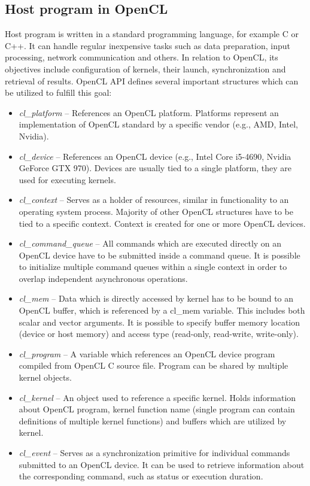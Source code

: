 \documentclass
[
    digital, %
    oneside, %
    table, %
    nolof, %
    nolot, %
    nocover %
]{fithesis3}
\begin{document}
\subsection{Host program in OpenCL}
Host program is written in a standard programming language, for example C or C++. It can handle regular inexpensive tasks such as data preparation,
input processing, network communication and others. In relation to OpenCL, its objectives include configuration of kernels, their launch,
synchronization and retrieval of results. OpenCL API defines several important structures which can be utilized to fulfill this goal:
\begin{itemize}
    \item \textit{cl\_platform} -- References an OpenCL platform. Platforms represent an implementation of OpenCL standard by a specific vendor
    (e.g., AMD, Intel, Nvidia). 
    \item \textit{cl\_device} -- References an OpenCL device (e.g., Intel Core i5-4690, Nvidia GeForce GTX 970). Devices are usually tied to a single
    platform, they are used for executing kernels.
    \item \textit{cl\_context} -- Serves as a holder of resources, similar in functionality to an operating system process. Majority of other OpenCL
    structures have to be tied to a specific context. Context is created for one or more OpenCL devices.
    \item \textit{cl\_command\_queue} -- All commands which are executed directly on an OpenCL device have to be submitted inside a command queue. It
    is possible to initialize multiple command queues within a single context in order to overlap independent asynchronous operations.
    \item \textit{cl\_mem} -- Data which is directly accessed by kernel has to be bound to an OpenCL buffer, which is referenced by a cl\_mem variable.
    This includes both scalar and vector arguments. It is possible to specify buffer memory location (device or host memory) and access type (read-only,
    read-write, write-only).
    \item \textit{cl\_program} -- A variable which references an OpenCL device program compiled from OpenCL C source file. Program can be shared by
    multiple kernel objects.
    \item \textit{cl\_kernel} -- An object used to reference a specific kernel. Holds information about OpenCL program, kernel function name (single
    program can contain definitions of multiple kernel functions) and buffers which are utilized by kernel.
    \item \textit{cl\_event} -- Serves as a synchronization primitive for individual commands submitted to an OpenCL device. It can be used to retrieve
    information about the corresponding command, such as status or execution duration.
\end{itemize}
\end{document}
